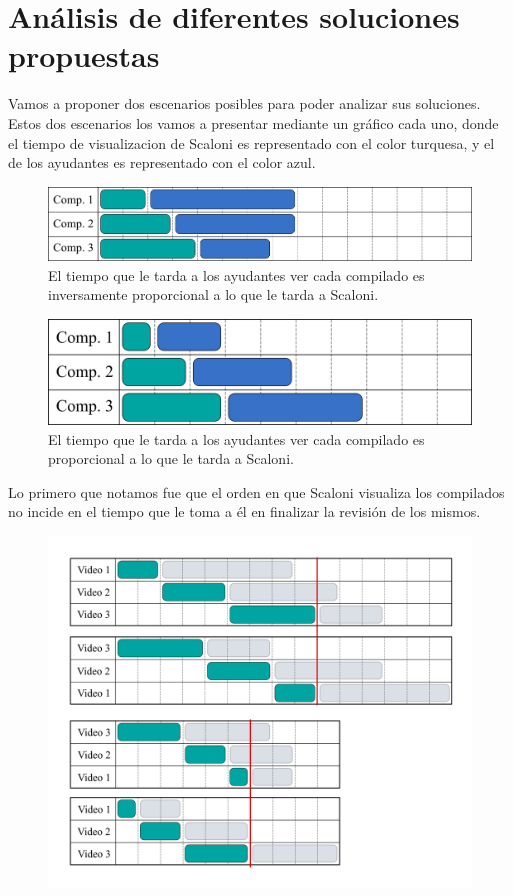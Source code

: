 \section{Análisis de diferentes soluciones propuestas}
Vamos a proponer dos escenarios posibles para poder analizar sus soluciones. Estos dos escenarios los vamos a presentar mediante un gráfico cada uno,
donde el tiempo de visualizacion de Scaloni es representado con el color turquesa, y el de los ayudantes es representado con el color azul.
\begin{figure}[H]
    \centering
    \includegraphics[width=1\textwidth]{img/caso-1.png}
    \caption{El tiempo que le tarda a los ayudantes ver cada compilado es inversamente proporcional a lo que le tarda a Scaloni.}
    \label{fig:Caso 1}
\end{figure}


\begin{figure}[H]
    \centering
    \includegraphics[width=1\textwidth]{img/caso-2.png}
    \caption{El tiempo que le tarda a los ayudantes ver cada compilado es proporcional a lo que le tarda a Scaloni.}
    \label{fig:Caso 2}
\end{figure}

Lo primero que notamos fue que el orden en que Scaloni visualiza los compilados no incide 
en el tiempo que le toma a él en finalizar la revisión de los mismos.

\begin{figure}[H]
    \centering
    \includegraphics[width=1\textwidth]{img/tiempos-scaloni.png}
    \label{fig:Caso 2}
\end{figure}


